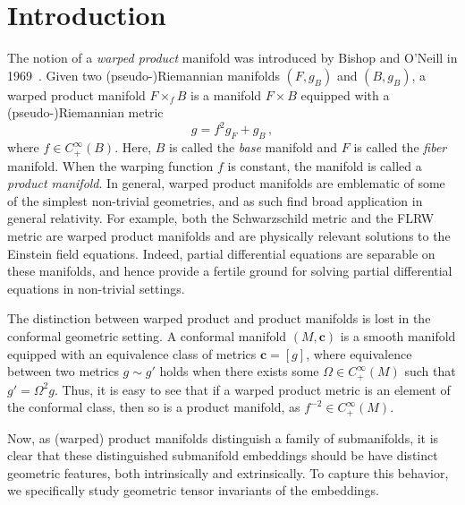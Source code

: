 \documentclass[a4paper,10.9pt]{amsart}
\theoremstyle{definition}
\theoremstyle{remark}
\numberwithin{equation}{section}
\newcommand{\cc}{\boldsymbol{c}}
\renewcommand{\=}{\stackrel \Sigma =}
\begin{document}
\section{Introduction}
The notion of a \textit{warped product} manifold was introduced by Bishop and O'Neill in 1969~\cite{bishoponeill}. Given two (pseudo-)Riemannian manifolds $(F,g_B)$ and $(B,g_B)$, a warped product manifold $F \times_f B$ is a manifold $F \times B$ equipped with a (pseudo-)Riemannian metric
\begin{equation} \label{warped}
g = f^2 g_F + g_B\,,
\end{equation}
where $f  \in C^\infty_+(B)$. Here, $B$ is called the \textit{base} manifold and $F$ is called the \textit{fiber} manifold. When the warping function $f$ is constant, the manifold is called a \textit{product manifold}. In general, warped product manifolds are emblematic of some of the simplest non-trivial geometries, and as such find broad application in general relativity. For example, both the Schwarzschild metric and the FLRW metric are warped product manifolds and are physically relevant solutions to the Einstein field equations. Indeed, partial differential equations are separable on these manifolds, and hence provide a fertile ground for solving partial differential equations in non-trivial settings.

The distinction between warped product and product manifolds is lost in the conformal geometric setting. A conformal manifold $(M,\cc)$ is a smooth manifold equipped with an equivalence class of metrics $\cc = [g]$, where equivalence between two metrics $g \sim g'$ holds when there exists some $\Omega \in C^\infty_+ (M)$ such that $g' = \Omega^2 g$. Thus, it is easy to see that if a warped product metric is an element of the conformal class, then so is a product manifold, as $f^{-2} \in C^\infty_+ (M)$.

Now, as (warped) product manifolds distinguish a family of submanifolds, it is clear that these distinguished submanifold embeddings should be have distinct geometric features, both intrinsically and extrinsically. To capture this behavior, we specifically study geometric tensor invariants of the embeddings.
\end{document}
